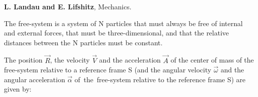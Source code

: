 \documentclass[10pt]{article}
\begin{document}
\par \bigskip\smallskip \noindent \textbf{L. Landau and E. Lifshitz}, Mechanics.

\newpage

\par {}

\par {}\hypertarget{p3a1}{}

\par \bigskip \noindent The free-system is a system of N particles that must always be free of internal and external forces, that must be three-dimensional, and that the relative distances between the N particles must be constant.

\par \bigskip \noindent The position ${\vec{\mathit{R}}}$, the velocity ${\vec{\mathit{V}}}$ and the acceleration ${\vec{\mathit{A}}}$ of the center of mass of the free-system relative to a reference frame S (and the angular velocity ${\vec{\omega}}$ and the angular acceleration ${\vec{\alpha}}$ \hbox {of the free-system} relative to the reference frame S) are given by:
\end{document}
